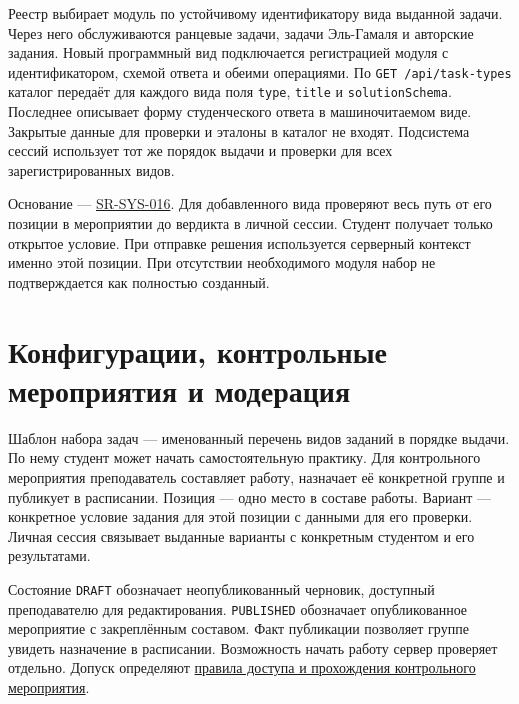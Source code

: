 \documentclass[12pt,a4paper]{article}
\begin{document}
Реестр выбирает модуль по устойчивому идентификатору вида выданной задачи. Через него обслуживаются ранцевые задачи, задачи Эль-Гамаля и авторские задания. Новый программный вид подключается регистрацией модуля с идентификатором, схемой ответа и обеими операциями. По \texttt{GET /\allowbreak{}api/\allowbreak{}task-\allowbreak{}types} каталог передаёт для каждого вида поля \texttt{type}, \texttt{title} и \texttt{solution\allowbreak{}Schema}. Последнее описывает форму студенческого ответа в машиночитаемом виде. Закрытые данные для проверки и эталоны в каталог не входят. Подсистема сессий использует тот же порядок выдачи и проверки для всех зарегистрированных видов.

Основание --- {\href{../04\_Системные\_требования/DOC-05\_Системные\_требования.pdf\#sr-sys-016}{SR-SYS-016}}. Для добавленного вида проверяют весь путь от его позиции в мероприятии до вердикта в личной сессии. Студент получает только открытое условие. При отправке решения используется серверный контекст именно этой позиции. При отсутствии необходимого модуля набор не подтверждается как полностью созданный.

\section{Конфигурации, контрольные мероприятия и модерация}\label{ux43aux43eux43dux444ux438ux433ux443ux440ux430ux446ux438ux438-ux43aux43eux43dux442ux440ux43eux43bux44cux43dux44bux435-ux43cux435ux440ux43eux43fux440ux438ux44fux442ux438ux44f-ux438-ux43cux43eux434ux435ux440ux430ux446ux438ux44f}

\hypertarget{конфигурации-контрольные-мероприятия-и-модерация}{}

Шаблон набора задач --- именованный перечень видов заданий в порядке выдачи. По нему студент может начать самостоятельную практику. Для контрольного мероприятия преподаватель составляет работу, назначает её конкретной группе и публикует в расписании. Позиция --- одно место в составе работы. Вариант --- конкретное условие задания для этой позиции с данными для его проверки. Личная сессия связывает выданные варианты с конкретным студентом и его результатами.

Состояние \texttt{DRAFT} обозначает неопубликованный черновик, доступный преподавателю для редактирования. \texttt{PUBLISHED} обозначает опубликованное мероприятие с закреплённым составом. Факт публикации позволяет группе увидеть назначение в расписании. Возможность начать работу сервер проверяет отдельно. Допуск определяют {\href{../02\_Техническое\_задание/Техническое\_задание.pdf\#правила-доступа-и-прохождения-контрольного-мероприятия}{правила доступа и прохождения контрольного мероприятия}}.
\end{document}
